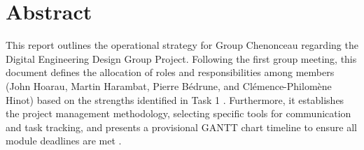 \section*{Abstract}

This report outlines the operational strategy for Group Chenonceau regarding the Digital Engineering Design Group Project. Following the first group meeting, this document defines the allocation of roles and responsibilities among members (John Hoarau, Martin Harambat, Pierre Bédrune, and Clémence-Philomène Hinot) based on the strengths identified in Task 1 \cite{hoarauTask1, harambatTask1}. Furthermore, it establishes the project management methodology, selecting specific tools for communication and task tracking, and presents a provisional GANTT chart timeline to ensure all module deadlines are met \cite{phillips2025brief}.